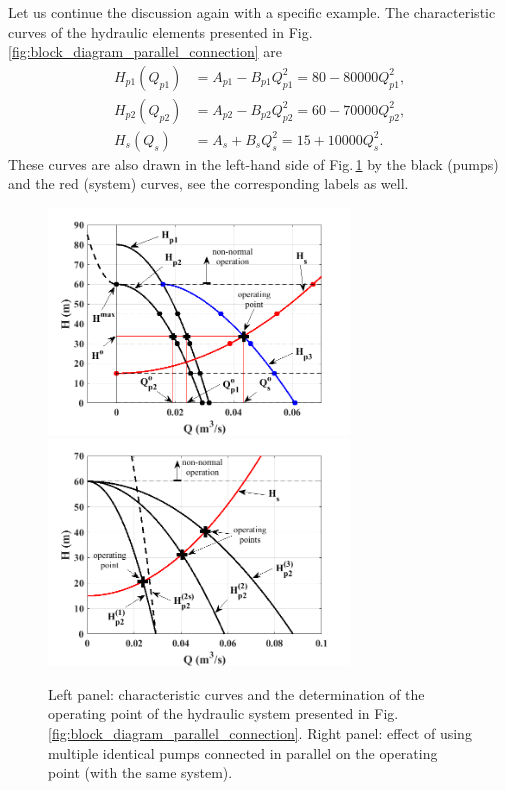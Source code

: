 Let us continue the discussion again with a specific example. The characteristic curves of the hydraulic elements presented in Fig.\,\ref{fig:block_diagram_parallel_connection} are
%
\begin{align}
H_{p1}(Q_{p1}) &= A_{p1} - B_{p1} Q_{p1}^2 = 80 - 80000 Q_{p1}^2, \label{pump1_characteristic_curve_parallel} \\
H_{p2}(Q_{p2}) &= A_{p2} - B_{p2} Q_{p2}^2 = 60 - 70000 Q_{p2}^2, \label{pump2_characteristic_curve_parallel} \\
H_s(Q_s)       &= A_s    + B_s    Q_s^2    = 15 + 10000 Q_s^2.    \label{system_characteristic_curve_parallel}
\end{align}
%
These curves are also drawn in the left-hand side of Fig.\,\ref{fig:example_parallel_connection} by the black (pumps) and the red (system) curves, see the corresponding labels as well.

\begin{figure}[ht!]
	\centering
		\includegraphics[width=8cm]{Control/Figures/TheoryParallelConnection.png}
		\includegraphics[width=8cm]{Control/Figures/TheoryParallelConnection_SamePumps.png}
	\caption{Left panel: characteristic curves and the determination of the operating point of the hydraulic system presented in Fig.\,\ref{fig:block_diagram_parallel_connection}. Right panel: effect of using multiple identical pumps connected in parallel on the operating point (with the same system).}
	\label{fig:example_parallel_connection}
\end{figure}

